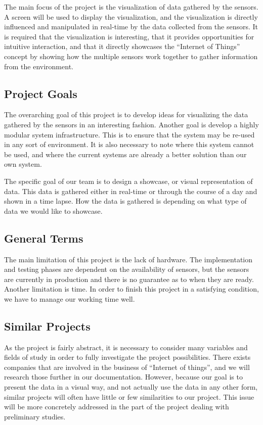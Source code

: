 ﻿\documentclass[../document.tex]{subfiles}
\begin{document}
The main focus of the project is the visualization of data gathered by the sensors. A screen will be used to display the visualization, and the visualization is directly influenced and manipulated in real-time by the data collected from the sensors. It is required that the visualization is interesting, that it provides opportunities for intuitive interaction, and that it directly showcases the ``Internet of Things'' concept by showing how the multiple sensors work together to gather information from the environment.

\subsection{Project Goals}
The overarching goal of this project is to develop ideas for visualizing the data gathered by the sensors in an interesting fashion. Another goal is develop a highly modular system infrastructure. This is to ensure that the system may be re-used in any sort of environment. It is also necessary to note where this system cannot be used, and where the current systems are already a better solution than our own system.

The specific goal of our team is to design a showcase, or visual representation of data. This data is gathered either in real-time or through the course of a day and shown in a time lapse. How the data is gathered is depending on what type of data we would like to showcase. 

\subsection{General Terms}
The main limitation of this project is the lack of hardware. The implementation and testing phases are dependent on the availability of sensors, but the sensors are currently in production and there is no guarantee as to when they are ready. Another limitation is time. In order to finish this project in a satisfying condition, we have to manage our working time well.

\subsection{Similar Projects}
As the project is fairly abstract, it is necessary to consider many variables and fields of study in order to fully investigate the project possibilities. There exists companies that are involved in the business of ``Internet of things'', and we will research those further in our documentation. However, because our goal is to present the data in a visual way, and not actually use the data in any other form, similar projects will often have little or few similarities to our project. This issue will be more concretely addressed in the part of the project dealing with preliminary studies.
\end{document}
